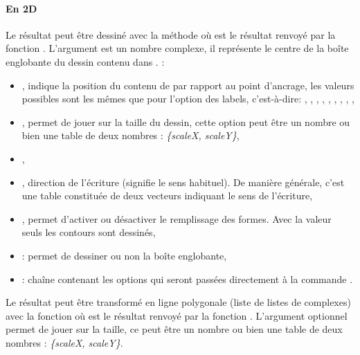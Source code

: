 \paragraph{En 2D} Le résultat peut être dessiné avec la méthode  où  est le résultat renvoyé par la fonction . L'argument  est un nombre complexe, il représente le centre de la boîte englobante du dessin contenu dans . \writeoptions :
\begin{itemize}
    \item {}, indique la position du contenu de  par rapport au point d'ancrage, les valeurs possibles sont les mêmes que pour l'option  des labels, c'est-à-dire: , , , , , , , , ,
    
    \item {}, permet de jouer sur la taille du dessin, cette option peut être un nombre ou bien une table de deux nombres : \emph{\{scaleX, scaleY\}},
    
    \item {},
    
    \item {}, direction de l'écriture (\nil signifie le sens habituel). De manière générale, c'est une table constituée de deux vecteurs  indiquant le sens de l'écriture,
    
    \item {}, permet d'activer ou désactiver le remplissage des formes. Avec la valeur \true seuls les contours sont dessinés,
    
    \item {} : permet de dessiner ou non la boîte englobante,
    
    \item {} : chaîne contenant les options qui seront passées directement à la commande \drawcmd.
\end{itemize}

Le résultat peut être transformé en ligne polygonale (liste de listes de complexes) avec la fonction  où  est le résultat renvoyé par la fonction . L'argument optionnel  permet de jouer sur la taille, ce peut être un nombre ou bien une table de deux nombres : \emph{\{scaleX, scaleY\}}.


